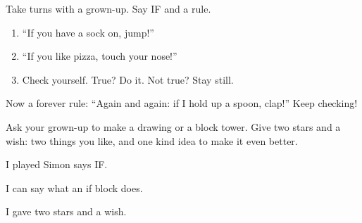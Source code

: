
\begin{playathome}
Take turns with a grown-up. Say IF and a rule.
\begin{enumerate}[leftmargin=1.4em,itemsep=2pt]
  \item \enquote{If you have a sock on, jump!}
  \item \enquote{If you like pizza, touch your nose!}
  \item Check yourself. True? Do it. Not true? Stay still.
\end{enumerate}
Now a forever rule: \enquote{Again and again: if I hold up a spoon, clap!} Keep checking!
\end{playathome}

\begin{playathome}
Ask your grown-up to make a drawing or a block tower. Give two stars and a wish: two things you like, and one kind idea to make it even better.
\end{playathome}

\begin{selfcheck}
  \item I played Simon says IF.
  \item I can say what an if block does.
  \item I gave two stars and a wish.
\end{selfcheck}
